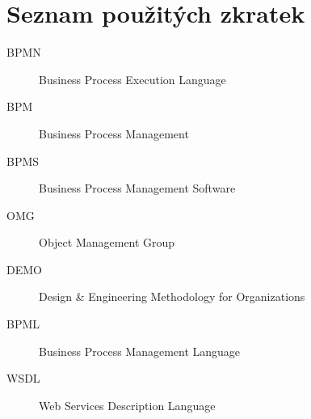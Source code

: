 \chapter{Seznam použitých zkratek}
\begin{description}
	\item[BPMN} Business Process Model and Notation
	\item[BPEL] Business Process Execution Language
	\item[BPM] Business Process Management
	\item[BPMS] Business Process Management Software
	\item[OMG] Object Management Group
	\item[DEMO] Design \& Engineering Methodology for Organizations
	\item[BPML] Business Process Management Language
	\item[WSDL] Web Services Description Language
\end{description}